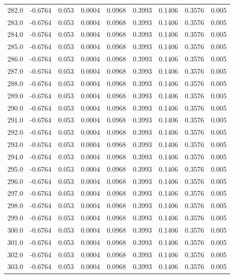 \begin{longtable}{lrrrrrrrr}
282.0 & -0.6764 & 0.053 & 0.0004 & 0.0968 & 0.3993 & 0.1406 & 0.3576 & 0.005 \\
283.0 & -0.6764 & 0.053 & 0.0004 & 0.0968 & 0.3993 & 0.1406 & 0.3576 & 0.005 \\
284.0 & -0.6764 & 0.053 & 0.0004 & 0.0968 & 0.3993 & 0.1406 & 0.3576 & 0.005 \\
285.0 & -0.6764 & 0.053 & 0.0004 & 0.0968 & 0.3993 & 0.1406 & 0.3576 & 0.005 \\
286.0 & -0.6764 & 0.053 & 0.0004 & 0.0968 & 0.3993 & 0.1406 & 0.3576 & 0.005 \\
287.0 & -0.6764 & 0.053 & 0.0004 & 0.0968 & 0.3993 & 0.1406 & 0.3576 & 0.005 \\
288.0 & -0.6764 & 0.053 & 0.0004 & 0.0968 & 0.3993 & 0.1406 & 0.3576 & 0.005 \\
289.0 & -0.6764 & 0.053 & 0.0004 & 0.0968 & 0.3993 & 0.1406 & 0.3576 & 0.005 \\
290.0 & -0.6764 & 0.053 & 0.0004 & 0.0968 & 0.3993 & 0.1406 & 0.3576 & 0.005 \\
291.0 & -0.6764 & 0.053 & 0.0004 & 0.0968 & 0.3993 & 0.1406 & 0.3576 & 0.005 \\
292.0 & -0.6764 & 0.053 & 0.0004 & 0.0968 & 0.3993 & 0.1406 & 0.3576 & 0.005 \\
293.0 & -0.6764 & 0.053 & 0.0004 & 0.0968 & 0.3993 & 0.1406 & 0.3576 & 0.005 \\
294.0 & -0.6764 & 0.053 & 0.0004 & 0.0968 & 0.3993 & 0.1406 & 0.3576 & 0.005 \\
295.0 & -0.6764 & 0.053 & 0.0004 & 0.0968 & 0.3993 & 0.1406 & 0.3576 & 0.005 \\
296.0 & -0.6764 & 0.053 & 0.0004 & 0.0968 & 0.3993 & 0.1406 & 0.3576 & 0.005 \\
297.0 & -0.6764 & 0.053 & 0.0004 & 0.0968 & 0.3993 & 0.1406 & 0.3576 & 0.005 \\
298.0 & -0.6764 & 0.053 & 0.0004 & 0.0968 & 0.3993 & 0.1406 & 0.3576 & 0.005 \\
299.0 & -0.6764 & 0.053 & 0.0004 & 0.0968 & 0.3993 & 0.1406 & 0.3576 & 0.005 \\
300.0 & -0.6764 & 0.053 & 0.0004 & 0.0968 & 0.3993 & 0.1406 & 0.3576 & 0.005 \\
301.0 & -0.6764 & 0.053 & 0.0004 & 0.0968 & 0.3993 & 0.1406 & 0.3576 & 0.005 \\
302.0 & -0.6764 & 0.053 & 0.0004 & 0.0968 & 0.3993 & 0.1406 & 0.3576 & 0.005 \\
303.0 & -0.6764 & 0.053 & 0.0004 & 0.0968 & 0.3993 & 0.1406 & 0.3576 & 0.005 \\

\end{longtable}
